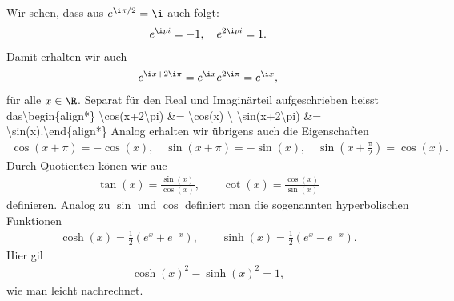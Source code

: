 \documentclass[letterpaper,10pt,english]{jupyterBook}
\begin{document}
Wir sehen, dass aus \( e^{\i \pi/2 } = \i\) auch folgt:
\begin{equation*}
\begin{split} e^{\i pi} = -1, \quad e^{2 \i pi} =  1.\end{split}
\end{equation*}
Damit erhalten wir auch
\begin{equation*}
\begin{split} e^{\i x + 2 \i \pi} = e^{\i x}e^{2 \i \pi} = e^{\i x},\end{split}
\end{equation*}
für alle \(x \in \R\). Separat für den Real\sphinxhyphen{} und Imaginärteil aufgeschrieben heisst das\textbackslash{}begin\{align*\}
\textbackslash{}cos(x+2\textbackslash{}pi) \&= \textbackslash{}cos(x) \textbackslash{}
\textbackslash{}sin(x+2\textbackslash{}pi) \&= \textbackslash{}sin(x).\textbackslash{}end\{align*\}
Analog erhalten wir übrigens auch die Eigenschaften
\begin{equation*}
\begin{split} \cos(x+ \pi) = -\cos(x) , \quad  \sin(x+\pi) = - \sin(x), \quad \sin(x+\frac{\pi}2) = \cos(x).\end{split}
\end{equation*}
Durch Quotienten könen wir auc
\begin{equation*}
\begin{split} \tan(x) = \frac{\sin(x)}{\cos(x)} , \qquad \cot(x) = \frac{\cos(x)}{\sin(x)}\end{split}
\end{equation*}
definieren.  Analog zu \(\sin\) und \(\cos\) definiert man die sogenannten hyperbolischen Funktionen
\begin{equation*}
\begin{split} \cosh(x) = \frac{1}2 (e^x+e^{-x}), \qquad \sinh(x) = \frac{1}2 (e^x-e^{-x}).\end{split}
\end{equation*}
Hier gil
\begin{equation*}
\begin{split} \cosh(x)^2 - \sinh(x)^2 = 1,\end{split}
\end{equation*}
wie man leicht nachrechnet.
\end{document}
